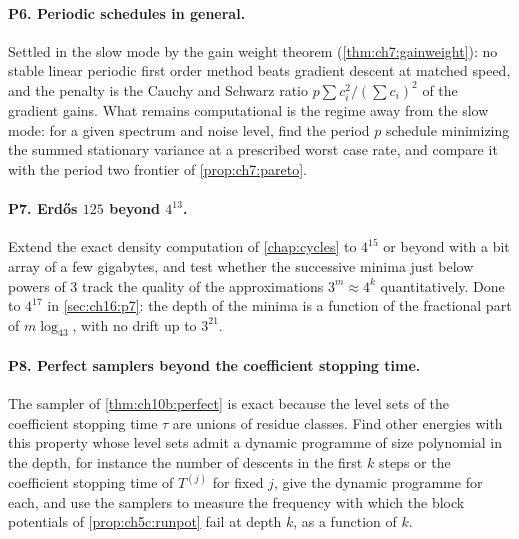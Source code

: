 \paragraph{P6. Periodic schedules in general.} Settled in the slow mode by the
gain weight theorem (\cref{thm:ch7:gainweight}): no stable linear periodic
first order method beats gradient descent at matched speed, and the penalty is
the Cauchy and Schwarz ratio $p\sum c_i^2/(\sum c_i)^2$ of the gradient gains.
What remains computational is the regime away from the slow mode: for a given
spectrum and noise level, find the period $p$ schedule minimizing the summed
stationary variance at a prescribed worst case rate, and compare it with the
period two frontier of \cref{prop:ch7:pareto}.

\paragraph{P7. Erd\H{o}s $125$ beyond $4^{13}$.} Extend the exact density
computation of \cref{chap:cycles} to $4^{15}$ or beyond with a bit array of a
few gigabytes, and test whether the successive minima just below powers of $3$
track the quality of the approximations $3^m\approx4^k$ quantitatively.
Done to $4^{17}$ in \cref{sec:ch16:p7}: the depth of the minima is a function of the
fractional part of $m\log_43$, with no drift up to $3^{21}$.

\paragraph{P8. Perfect samplers beyond the coefficient stopping time.} The sampler of
\cref{thm:ch10b:perfect} is exact because the level sets of the coefficient stopping time $\tau$ are unions
of residue classes. Find other energies with this property whose level sets admit a dynamic programme of size polynomial in the depth,
for instance the number of descents in the first $k$ steps or the coefficient stopping time
of $T^{(j)}$ for fixed $j$, give the dynamic programme for each, and use the
samplers to measure the frequency with which the block potentials of
\cref{prop:ch5c:runpot} fail at depth $k$, as a function of $k$.

